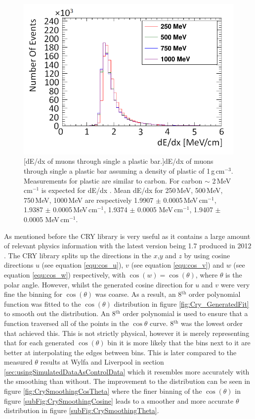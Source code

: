 \begin{figure}[!h]
 \centering
 \includegraphics[width=0.5\linewidth]{Chapter4/Figs/Raster/year1Plots/muons_per_mev_cmMedText.png}
 [dE/dx of muons through single a plastic bar.]{dE/dx of muons through single a plastic bar assuming a density of plastic of 1\,g\,cm$^{-3}$. Measurements for plastic are similar to carbon. For carbon $\sim$ 2\,MeV\,cm$^{-1}$ is expected for dE/dx {\cite{Olive_2014}. Mean dE/dx for 250\,MeV, 500\,MeV, 750\,MeV, 1000\,MeV are respectively 1.9907 $\pm$  0.0005\,MeV\,cm$^{-1}$, 1.9387 $\pm$  0.0005\,MeV\,cm$^{-1}$, 1.9374 $\pm$  0.0005 MeV\,cm$^{-1}$, 1.9407 $\pm$  0.0005 MeV\,cm$^{-1}$.\\}}
 \label{fig:mev_per_cm_muons}
\end{figure}

As mentioned before the CRY library is very useful as it contains a large amount of relevant physics information with the latest version being 1.7 produced in 2012 \cite{hagmann2012cosmicCry}. The CRY library splits up the directions in the $x$,$y$ and $z$ by using cosine directions $u$ (see equation \ref{equ:cos_u}), $v$ (see equation \ref{equ:cos_v}) and $w$ (see equation \ref{equ:cos_w}) respectively, with $\cos(w) = \cos(\theta)$, where $\theta$ is the polar angle. However, whilst the generated cosine direction for $u$ and $v$ were very fine the binning for $\cos(\theta)$ was coarse. As a result, an 8$^{\textrm{th}}$ order polynomial function was fitted to the $\cos(\theta)$ distribution in figure \ref{fig:Cry_GeneratedFit} to smooth out the distribution. An 8$^{\textrm{th}}$ order polynomial is used to ensure that a function traversed all of the points in the $\cos{\theta}$ curve. 8$^{\textrm{th}}$ was the lowest order that achieved this. This is not strictly physical, however it is merely representing that for each generated $\cos(\theta)$ bin it is more likely that the bins next to it are better at interpolating the edges between bins. This is later compared to the measured $\theta$ results at Wylfa and Liverpool in section \ref{sec:usingSimulatedDataAsControlData} which it resembles more accurately with the smoothing than without. The improvement to the distribution can be seen in figure \ref{fig:CrySmoothingCosTheta} where the finer binning of the $\cos(\theta)$ in figure \ref{subFig:CrySmoothingCosine} leads to a smoother and more accurate $\theta$ distribution in figure \ref{subFig:CrySmoothingTheta}. 

